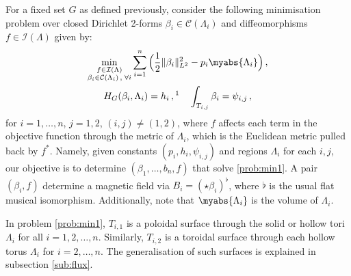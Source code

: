 \documentclass[11pt]{article}
\theoremstyle{plain}
\theoremstyle{definition}
\theoremstyle{remark}
\newcommand{\ST}{\Lambda}
\newcommand{\C}{\mathcal{C} (\ST_i)}
\newcommand{\I}{\mathcal{I}(\ST)}
\begin{document}
For a fixed set \(G\) as defined previously, consider the following minimisation problem over closed Dirichlet 2-forms \(\beta _i \in \C \) and diffeomorphisms \(f \in \I\) given by:
\begin{align} \label{prob:min1}
\begin{gathered}
    \min_{\substack{f \in \I \\ \beta _i \in \C \, , \; \forall i }} \sum_{i=1}^n \Big( \frac{1}{2} \| \beta _i\|_{L^2}^2 - p_i \myabs{\ST_i} \Big) \, , \\ H_G ( \beta_i , \ST_i ) = h_i  \, , \text{\footnotemark}
  \quad \int_{T_{i,j}} \beta _i = \psi_{i,j} \, , 
\end{gathered}
\end{align}
for \(i = 1, \dots, n\), \(j = 1,2\), \((i,j) \neq (1,2)\), where \(f\) affects each term in the objective function through the metric of \(\Lambda_i\), which is the Euclidean metric pulled back by \(f^*\). Namely, given constants \((p_i, h_i, \psi_{i,j})\) and regions \(\ST_i\) for each \(i,j\), our objective is to determine \((\beta _1, \dots, b_n, f)\) that solve \eqref{prob:min1}. A pair \((\beta _i, f)\) determine a magnetic field via \(B_i = (\star  \beta _i)^\flat\), where \(\flat\) is the usual flat musical isomorphism. Additionally, note that \(\myabs{\ST_i}\) is the volume of \(\ST_i\).


In problem \eqref{prob:min1}, \(T_{i,1}\) is a poloidal surface through the solid or hollow tori \(\ST_i\) for all \(i = 1,2, \dots, n\). Similarly, \(T_{i,2}\) is a toroidal surface through each hollow torus \(\ST_i\) for \(i = 2, \dots, n\). The generalisation of such surfaces is explained in subsection \ref{sub:flux}. 
\end{document}
